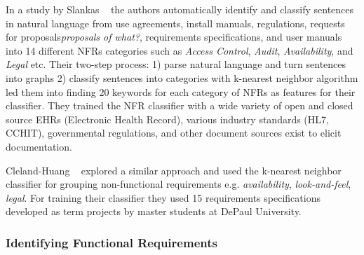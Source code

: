 	In a study by Slankas \etal~\cite{Slankas:2013} the authors automatically
identify and classify sentences in natural language from use agreements, install
manuals, regulations, requests for proposals\emph{proposals of what?},
requirements specifications, and user manuals into 14 different NFRs categories such as 
\emph{Access Control}, \emph{Audit}, \emph{Availability},  and \emph{Legal} etc.
Their two-step process: 1) parse natural language and turn sentences into graphs
2) classify sentences into categories with k-nearest neighbor algorithm led them
into finding 20 keywords for each category of NFRs as features for their
classifier. They trained the NFR classifier
with a wide variety of open and closed source EHRs (Electronic Health Record),
various industry standards (HL7, CCHIT), governmental regulations, and other
document sources exist to elicit documentation.

 	Cleland-Huang \etal~\cite{Cleland-Huang2007} explored a similar approach and
used the k-nearest neighbor classifier for grouping non-functional requirements e.g.
\emph{availability}, \emph{look-and-feel}, \emph{legal}. For training their classifier they used 15 requirements specifications developed as term projects by master students at DePaul University.

\subsubsection{Identifying Functional Requirements}

